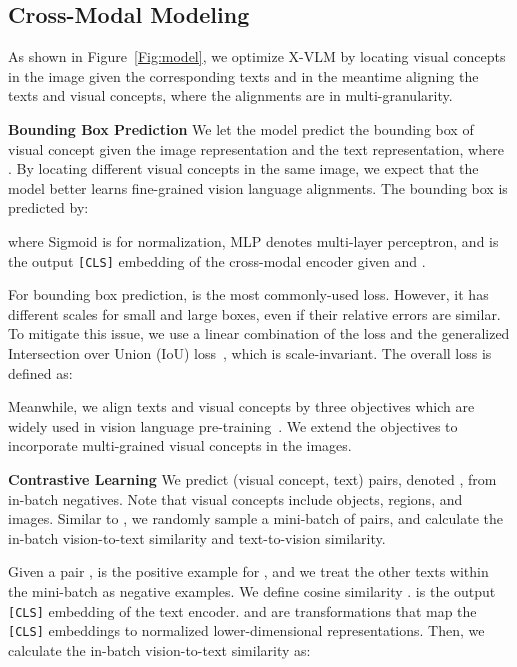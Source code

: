 \documentclass[nohyperref]{article}
\theoremstyle{plain}
\theoremstyle{definition}
\theoremstyle{remark}
\begin{document}
\subsection{Cross-Modal Modeling} 


As shown in Figure~\ref{Fig:model}, we optimize X-VLM by locating visual concepts in the image given the corresponding texts and in the meantime aligning the texts and visual concepts, where the alignments are in multi-granularity.


\noindent\textbf{Bounding Box Prediction} We let the model predict the bounding box  of visual concept  given the image representation and the text representation, where . By locating different visual concepts in the same image, we expect that the model better learns fine-grained vision language alignments. The bounding box is predicted by: 

where Sigmoid is for normalization, MLP denotes multi-layer perceptron, and  is the output \texttt{[CLS]} embedding of the cross-modal encoder given  and . 


For bounding box prediction,  is the most commonly-used loss. However, it has different scales for small and large boxes, even if their relative errors are similar. To mitigate this issue, we use a linear combination of the  loss and the generalized Intersection over Union (IoU) loss~\cite{rezatofighi2019generalized}, which is scale-invariant. The overall loss is defined as: 



Meanwhile, we align texts and visual concepts by three objectives which are widely used in vision language pre-training~\cite{chen2020uniter, radford2021learning, li2021align}. We extend the objectives to incorporate multi-grained visual concepts in the images. 


\noindent\textbf{Contrastive Learning} We predict (visual concept, text) pairs, denoted , from in-batch negatives. Note that visual concepts include objects, regions, and images. Similar to \citet{radford2021learning}, we randomly sample a mini-batch of  pairs, and calculate the in-batch vision-to-text similarity and text-to-vision similarity. 


Given a pair ,  is the positive example for , and we treat the other  texts within the mini-batch as negative examples. We define cosine similarity .  is the output \texttt{[CLS]} embedding of the text encoder.  and  are transformations that map the \texttt{[CLS]} embeddings to normalized lower-dimensional representations. Then, we calculate the in-batch vision-to-text similarity as: 
\end{document}

